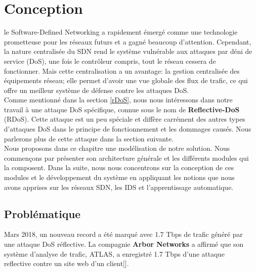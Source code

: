 \chapter{Conception}

\label{Chapter4} 
le Software-Defined Networking a rapidement émergé comme une technologie prometteuse pour les réseaux futurs et a gagné beaucoup d'attention. Cependant, la nature centralisée du SDN rend le système vulnérable aux attaques par déni de service (DoS), une fois le contrôleur compris, tout le réseau cessera de fonctionner. Mais cette centralisation a un avantage: la gestion centralisée des équipements réseau; elle permet d'avoir une vue globale des flux de trafic, ce qui offre un meilleur système de défense contre les attaques DoS.\\

Comme mentionné dans la section \ref{rDoS}, nous nous intéressons dans notre travail à une attaque DoS spécifique, connue sous le nom de \textbf{Reflective-DoS} (RDoS). Cette attaque est un peu spéciale et diffère carrément des autres types d'attaques DoS dans le principe de fonctionnement et les dommages causés. Nous parlerons plus de cette attaque dans la section suivante. \\

Nous proposons dans ce chapitre une modélisation de notre solution. Nous commençons par présenter son architecture générale et les différents modules qui la composent. Dans la suite, nous nous concentrons sur la conception de ces modules et le développement du système en appliquant les notions que nous avons apprises sur les réseaux SDN, les IDS et l’apprentissage automatique.

\section{Problématique}
Mars 2018, un nouveau record a été marqué avec 1.7 Tbps de trafic généré par une attaque DoS réflective. La compagnie \textbf{Arbor Networks} a affirmé que son système d'analyse de trafic, ATLAS, a enregistré 1.7 Tbps d'une attaque reflective contre un site web d'un client[\cite{22}].\\

